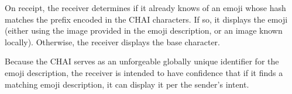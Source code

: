 \documentclass[12pt]{article}
\begin{document}
On receipt, the receiver determines if it already knows of an emoji
whose hash matches the prefix encoded in the CHAI characters. If so,
it displays the emoji (either using the image provided in the emoji
description, or an image known locally). Otherwise, the receiver
displays the base character.

%

Because the CHAI serves as an unforgeable globally unique identifier
for the emoji description, the receiver is intended to have confidence
that if it finds a matching emoji description, it can
display it per the sender's intent.




%
%
%
\end{document}
